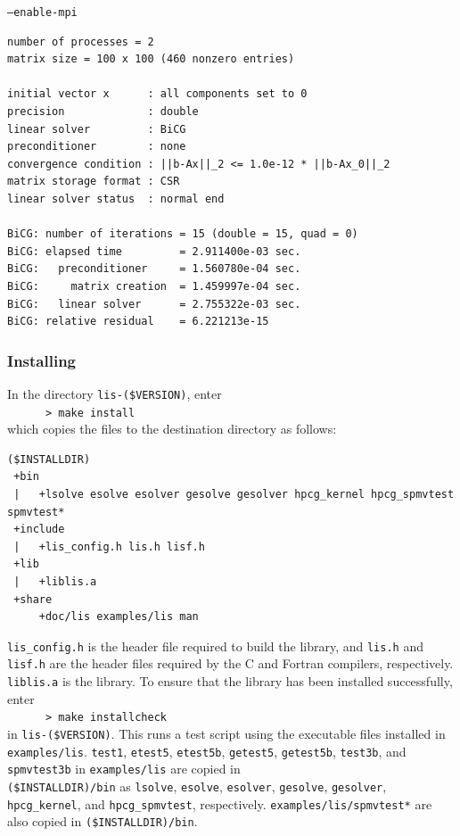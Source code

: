 \documentclass[a4paper]{article}
\begin{document}
\begin{itembox}[l]{\tt --enable-mpi}
 \begin{minipage}{10cm}
 \begin{verbatim}
number of processes = 2
matrix size = 100 x 100 (460 nonzero entries)

initial vector x      : all components set to 0
precision             : double
linear solver         : BiCG
preconditioner        : none
convergence condition : ||b-Ax||_2 <= 1.0e-12 * ||b-Ax_0||_2
matrix storage format : CSR
linear solver status  : normal end

BiCG: number of iterations = 15 (double = 15, quad = 0)
BiCG: elapsed time         = 2.911400e-03 sec.
BiCG:   preconditioner     = 1.560780e-04 sec. 
BiCG:     matrix creation  = 1.459997e-04 sec.
BiCG:   linear solver      = 2.755322e-03 sec.
BiCG: relative residual    = 6.221213e-15
 \end{verbatim}
 \end{minipage}
\end{itembox}

\subsubsection{Installing}
In the directory {\tt lis-(\$VERSION)}, enter\\
 \verb+      > make install+\\
which copies the files to the destination directory as follows:

\begin{verbatim}
($INSTALLDIR)
 +bin
 |   +lsolve esolve esolver gesolve gesolver hpcg_kernel hpcg_spmvtest spmvtest*
 +include
 |   +lis_config.h lis.h lisf.h
 +lib
 |   +liblis.a
 +share
     +doc/lis examples/lis man
\end{verbatim}

{\tt lis\_config.h} is the header file required to build the library, and 
{\tt lis.h} and {\tt lisf.h} are the header files required 
by the C and Fortran compilers, respectively. 
{\tt liblis.a} is the library.
To ensure that the library has been installed successfully, enter\\
 \verb+      > make installcheck+\\
in {\tt lis-(\$VERSION)}.
This runs a test script using the executable files installed 
in {\tt examples/lis}. 
{\tt test1}, {\tt etest5}, {\tt etest5b}, {\tt getest5}, {\tt getest5b}, {\tt test3b}, and {\tt spmvtest3b} 
in {\tt examples/lis} 
are copied in \\
{\tt (\$INSTALLDIR)/bin} as {\tt lsolve}, {\tt esolve}, {\tt esolver}, 
{\tt gesolve}, {\tt gesolver}, {\tt hpcg\_kernel}, and {\tt hpcg\_spmvtest}, respectively. {\tt examples/lis/spmvtest*} are also copied in 
{\tt (\$INSTALLDIR)/bin}.
\end{document}
